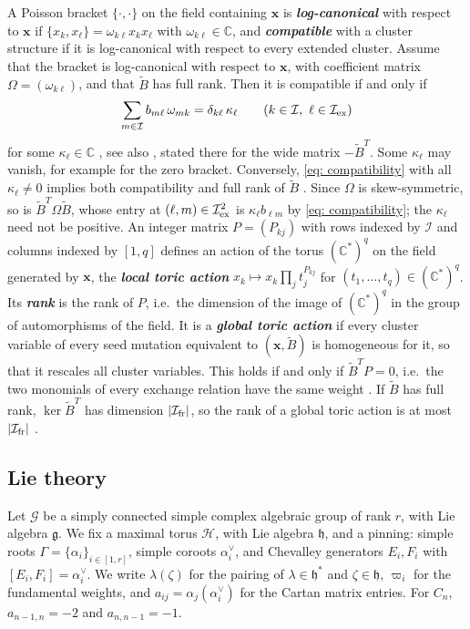 \documentclass[a4paper]{amsart}
\numberwithin{equation}{section}
\theoremstyle{definition}
\theoremstyle{remark}
\newcommand{\bbC}{\mathbb{C}}
\newcommand{\mfh}{\mathfrak{h}}
\newcommand{\mfg}{\mathfrak{g}}
\newcommand{\mcG}{\mathcal{G}}
\newcommand{\mcH}{\mathcal{H}}
\newcommand{\mcI}{\mathcal{I}}
\newcommand{\bx}{\mathbf{x}}
\newcommand{\tB}{\widetilde{B}}
\newcommand{\ex}{{\rm ex}}
\newcommand{\fr}{{\rm fr}}
\newcommand{\newword}[1]{\textbf{\emph{#1}}}
\begin{document}
A Poisson bracket $\{\cdot,\cdot\}$ on the field containing $\bx$ is \newword{log-canonical} with respect to $\bx$ if $\{x_k,x_\ell\}=\omega_{k\ell}x_kx_\ell$ with $\omega_{k\ell}\in\bbC$, and \newword{compatible} with a cluster structure if it is log-canonical with respect to every extended cluster.
Assume that the bracket is log-canonical with respect to $\bx$, with coefficient matrix $\Omega=(\omega_{k\ell})$, and that $\tB$ has full rank.
Then it is compatible if and only if
\begin{equation}
  \label{eq: compatibility}
  \sum_{m\in\mcI}b_{m\ell}\,\omega_{mk}=\delta_{k\ell}\,\kappa_\ell
  \qquad(k\in\mcI,\ \ell\in\mcI_\ex)
\end{equation}
for some $\kappa_\ell\in\bbC$ \cite[Proposition~2.2]{GSV11}, see also \cite[Theorem~4.5]{GSV10}, stated there for the wide matrix $-\tB^T$.
Some $\kappa_\ell$ may vanish, for example for the zero bracket.
Conversely, \eqref{eq: compatibility} with all $\kappa_\ell\neq0$ implies both compatibility and full rank of $\tB$ \cite[Proposition~2.5]{GSV18dd}.
Since $\Omega$ is skew-symmetric, so is $\tB^T\Omega\tB$, whose entry at $(\ell,m)\in\mcI_\ex^2$ is $\kappa_\ell b_{\ell m}$ by \eqref{eq: compatibility}; the $\kappa_\ell$ need not be positive.
An integer matrix $P=(P_{kj})$ with rows indexed by $\mcI$ and columns indexed by $[1,q]$ defines an action of the torus $(\bbC^*)^q$ on the field generated by $\bx$, the \newword{local toric action} $x_k\mapsto x_k\prod_jt_j^{P_{kj}}$ for $(t_1,\dots,t_q)\in(\bbC^*)^q$.
  Its \newword{rank} is the rank of $P$, i.e.\ the dimension of the image of $(\bbC^*)^q$ in the group of automorphisms of the field.
It is a \newword{global toric action} if every cluster variable of every seed mutation equivalent to $(\bx,\tB)$ is homogeneous for it, so that it rescales all cluster variables.
  This holds if and only if $\tB^TP=0$, i.e.\ the two monomials of every exchange relation have the same weight \cite[Lemma~5.3]{GSV10}.
If $\tB$ has full rank, $\ker\tB^T$ has dimension $|\mcI_\fr|$, so the rank of a global toric action is at most $|\mcI_\fr|$ \cite[Section~2.2]{GSV11}.

\subsection{Lie theory}
\label{sec: Lie}
Let $\mcG$ be a simply connected simple complex algebraic group of rank $r$, with Lie algebra $\mfg$.
We fix a maximal torus $\mcH$, with Lie algebra $\mfh$, and a pinning: simple roots $\Gamma=\{\alpha_i\}_{i\in[1,r]}$, simple coroots $\alpha_i^\vee$, and Chevalley generators $E_i,F_i$ with $[E_i,F_i]=\alpha_i^\vee$.
We write $\lambda(\zeta)$ for the pairing of $\lambda\in\mfh^*$ and $\zeta\in\mfh$, $\varpi_i$ for the fundamental weights, and $a_{ij}=\alpha_j(\alpha_i^\vee)$ for the Cartan matrix entries.
  For $C_n$, $a_{n-1,n}=-2$ and $a_{n,n-1}=-1$.
\end{document}
